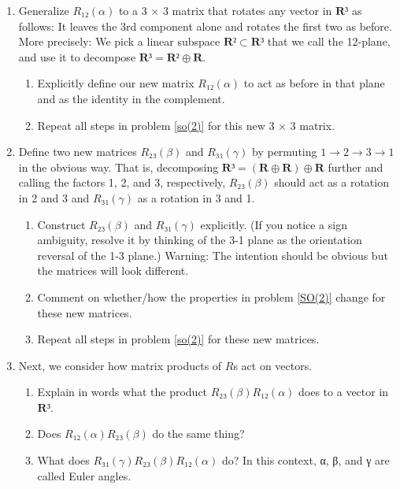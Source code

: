 \begin{enumerate}
\begin{enumerate}
		\item Take a moment to appreciate how remarkable this is. $L₁₂$ is only the first non-trivial term in a MacLauren series for $R₁₂(θ)$ ({\it i.e.} it is the infinitesimal part of the finite transformation), but it can be exponentiated to recover the entire finite transformation: In this case integration is just exponentiation.
	\end{enumerate}	
\item Generalize $R₁₂(α)$ to a 3 × 3 matrix that rotates any vector in $𝐑³$ as follows: It leaves the 3rd component alone and rotates the first two as before. More precisely: We pick a linear subspace $𝐑² ⊂ 𝐑³$ that we call the 12-plane, and use it to decompose $𝐑³ = 𝐑² ⊕ 𝐑$.
	\begin{enumerate}
	\item Explicitly define our new matrix $R₁₂(α)$ to act as before in that plane and as the identity in the complement.
	\item Repeat all steps in problem \ref{so(2)} for this new 3 × 3 matrix. 
	\end{enumerate}
\item Define two new matrices $R₂₃(β)$ and $R₃₁(γ)$ by permuting $1 → 2 → 3 → 1$ in the obvious way. 
That is, decomposing $𝐑³ = (𝐑 ⊕ 𝐑) ⊕ 𝐑$ further and calling the factors 1, 2, and 3, respectively, $R₂₃(β)$ should act as a rotation in 2 and 3 and $R₃₁(γ)$ as a rotation in 3 and 1. 
	\begin{enumerate}
	\item Construct $R₂₃(β)$ and $R₃₁(γ)$ explicitly. (If you notice a sign ambiguity, resolve it by thinking of the 3-1 plane as the orientation reversal of the 1-3 plane.) Warning: The intention should be obvious but the matrices will look different. 
	\item Comment on whether/how the properties in problem \ref{SO(2)} change for these new matrices. 
	\item Repeat all steps in problem \ref{so(2)} for these new matrices. 
	\end{enumerate}
\item Next, we consider how matrix products of $R$s act on vectors.
	\begin{enumerate}
	\item Explain in words what the product $R₂₃(β)R₁₂(α)$ does to a vector in $𝐑³$. 
	\item Does $R₁₂(α)R₂₃(β)$ do the same thing?
	\item What does $R₃₁(γ)R₂₃(β)R₁₂(α)$ do? In this context, α, β, and γ are called Euler angles. 

\end{enumerate}
\end{enumerate}
